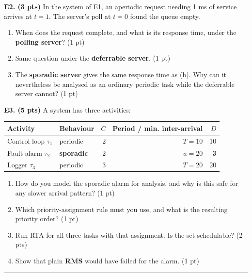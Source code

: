 \documentclass[
  11pt,
]{article}
\newcounter{none} %
\providecommand{\tightlist}{%
  \setlength{\itemsep}{0pt}\setlength{\parskip}{0pt}}
\begin{document}
\textbf{E2. (3 pts)} In the system of E1, an aperiodic request needing 1
ms of service arrives at \(t = 1\). The server's poll at \(t = 0\) found
the queue empty.

\begin{enumerate}
\def\labelenumi{\alph{enumi}.}
\tightlist
\item
  When does the request complete, and what is its response time, under
  the \textbf{polling server}? (1 pt)
\item
  Same question under the \textbf{deferrable server}. (1 pt)
\item
  The \textbf{sporadic server} gives the same response time as (b). Why
  can it nevertheless be analysed as an ordinary periodic task while the
  deferrable server cannot? (1 pt)
\end{enumerate}

\textbf{E3. (5 pts)} A system has three activities:

{\def\LTcaptype{none} %
\begin{longtable}[]{@{}llrrr@{}}
\toprule\noalign{}
Activity & Behaviour & \(C\) & Period / min. inter-arrival & \(D\) \\
\midrule\noalign{}
\endhead
\bottomrule\noalign{}
\endlastfoot
Control loop \(\tau_1\) & periodic & 2 & \(T = 10\) & 10 \\
Fault alarm \(\tau_2\) & \textbf{sporadic} & 2 & \(a = 20\) &
\textbf{3} \\
Logger \(\tau_3\) & periodic & 3 & \(T = 20\) & 20 \\
\end{longtable}
}

\begin{enumerate}
\def\labelenumi{\alph{enumi}.}
\tightlist
\item
  How do you model the sporadic alarm for analysis, and why is this safe
  for any slower arrival pattern? (1 pt)
\item
  Which priority-assignment rule must you use, and what is the resulting
  priority order? (1 pt)
\item
  Run RTA for all three tasks with that assignment. Is the set
  schedulable? (2 pts)
\item
  Show that plain \textbf{RMS} would have failed for the alarm. (1 pt)
\end{enumerate}

\begin{center}\rule{0.5\linewidth}{0.5pt}\end{center}
\end{document}
